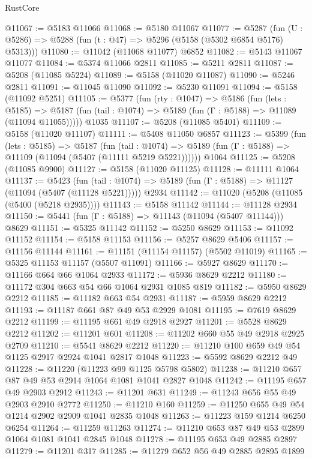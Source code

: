 \begin{lexlean}{RustCore}
\begin{coremodule}
@11067 := @5183 @11066
@11068 := @5180 @11067
@11077 := @5287
    (fun (U : @5286) => @5288 (fun (t : @47) => @5296 (@5158 (@5302 @6854 @5176) @5313)))
@11080 := @11042 (@11068 @11077) @6852
@11082 := @5143 @11067 @11077
@11084 := @5374 @11066 @2811
@11085 := @5211 @2811
@11087 := @5208 (@11085 @5224)
@11089 := @5158 (@11020 @11087)
@11090 := @5246 @2811
@11091 := @11045 @11090
@11092 := @5230 @11091
@11094 := @5158 (@11092 @5251)
@11105 := @5377
    (fun (rty : @1047) =>
    @5186
      (fun (lets : @5185) =>
      @5187 (fun (tail : @1074) => @5189 (fun (Γ : @5188) => @11089 (@11094 @11055)))))
    @1035
@11107 := @5208 (@11085 @5401)
@11109 := @5158 (@11020 @11107)
@11111 := @5408 @11050 @6857
@11123 := @5399
    (fun (lets : @5185) =>
    @5187
      (fun (tail : @1074) =>
      @5189 (fun (Γ : @5188) => @11109 (@11094 (@5407 (@11111 @5219 @5221))))))
    @1064
@11125 := @5208 (@11085 @9900)
@11127 := @5158 (@11020 @11125)
@11128 := @11111 @1064
@11137 := @5423
    (fun (tail : @1074) => @5189 (fun (Γ : @5188) => @11127 (@11094 (@5407 (@11128 @5221)))))
    @2934
@11142 := @11020 (@5208 (@11085 (@5400 (@5218 @2935))))
@11143 := @5158 @11142
@11144 := @11128 @2934
@11150 := @5441 (fun (Γ : @5188) => @11143 (@11094 (@5407 @11144))) @8629
@11151 := @5325 @11142
@11152 := @5250 @8629
@11153 := @11092 @11152
@11154 := @5158 @11153
@11156 := @5257 @8629 @5406
@11157 := @11156 @11144
@11161 := @11151 (@11154 @11157) (@5502 @11019)
@11165 := @5325 @11153 @11157 (@5507 @11091)
@11166 := @5927 @8629
@11170 := @11166 @664 @66 @1064 @2933
@11172 := @5936 @8629 @2212
@11180 := @11172 @304 @663 @54 @66 @1064 @2931 @1085 @819
@11182 := @5950 @8629 @2212
@11185 := @11182 @663 @54 @2931
@11187 := @5959 @8629 @2212
@11193 := @11187 @661 @87 @49 @53 @2929 @1081
@11195 := @7619 @8629 @2212
@11199 := @11195 @661 @49 @2918 @2927
@11201 := @5528 @8629 @2212
@11202 := @11201 @601
@11208 := @11202 @660 @55 @49 @2918 @2925 @2709
@11210 := @5541 @8629 @2212
@11220 := @11210 @100 @659 @49 @54 @1125 @2917 @2924 @1041 @2817 @1048
@11223 := @5592 @8629 @2212 @49
@11228 := @11220 (@11223 @99 @1125 @5798 @5802)
@11238 := @11210 @657 @87 @49 @53 @2914 @1064 @1081 @1041 @2827 @1048
@11242 := @11195 @657 @49 @2903 @2912
@11243 := @11201 @631
@11249 := @11243 @656 @55 @49 @2903 @2910 @2772
@11250 := @11210 @160
@11259 := @11250 @655 @49 @54 @1214 @2902 @2909 @1041 @2835 @1048
@11263 := @11223 @159 @1214 @6250 @6254
@11264 := @11259 @11263
@11274 := @11210 @653 @87 @49 @53 @2899 @1064 @1081 @1041 @2845 @1048
@11278 := @11195 @653 @49 @2885 @2897
@11279 := @11201 @317
@11285 := @11279 @652 @56 @49 @2885 @2895 @1899

\end{coremodule}
\end{lexlean}

